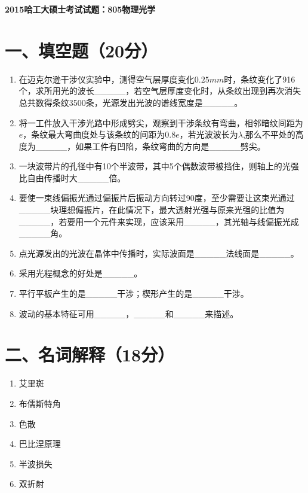 \documentclass[12pt, a4paper]{article}
\theoremstyle{solution}
\begin{document}
\begin{center}
\Large\textbf{2015哈工大硕士考试试题：805物理光学}
\end{center}





\section*{一、填空题（20分）}
\begin{enumerate}
    \item 在迈克尔逊干涉仪实验中，测得空气层厚度变化$0.25mm$时，条纹变化了916个，求所用光的波长\_\_\_\_\_，若空气层厚度变化时，从条纹出现到再次消失总共数得条纹3500条，光源发出光波的谱线宽度是\_\_\_\_\_。
    \item 将一工件放入干涉光路中形成劈尖，观察到干涉条纹有弯曲，相邻暗纹间距为$e$，条纹最大弯曲度处与该条纹的间距为$0.8e$，若光波波长为$\lambda$,那么不平处的高度为\_\_\_\_\_，如果工件有凹陷，条纹弯曲的方向是\_\_\_\_\_劈尖。
    \item 一块波带片的孔径中有10个半波带，其中5个偶数波带被挡住，则轴上的光强比自由传播时大\_\_\_\_\_倍。
    \item 要使一束线偏振光通过偏振片后振动方向转过90度，至少需要让这束光通过\_\_\_\_\_块理想偏振片，在此情况下，最大透射光强与原来光强的比值为\_\_\_\_\_，若要用一个元件来实现，应该采用\_\_\_\_\_，其光轴与线偏振光成\_\_\_\_\_角。
    \item 点光源发出的光波在晶体中传播时，实际波面是\_\_\_\_\_法线面是\_\_\_\_\_。
    \item 采用光程概念的好处是\_\_\_\_\_。
    \item 平行平板产生的是\_\_\_\_\_干涉；楔形产生的是\_\_\_\_\_干涉。
    \item 波动的基本特征可用\_\_\_\_\_，\_\_\_\_\_和\_\_\_\_\_来描述。
\end{enumerate}
\section*{二、名词解释（18分）}
\begin{enumerate}
    \item 艾里斑
    \item 布儒斯特角
    \item 色散
    \item 巴比涅原理
    \item 半波损失
    \item 双折射
\end{enumerate}
\end{document}
